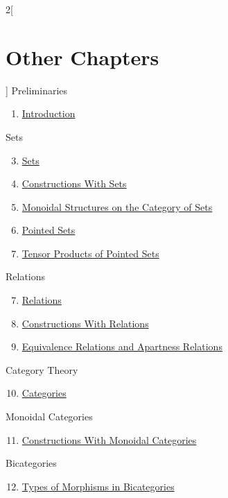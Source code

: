 \begin{multicols}{2}[\section{Other Chapters}]
\noindent
Preliminaries
\begin{enumerate}
\item \hyperref[introduction:section-phantom]{Introduction}
\end{enumerate}
Sets
\begin{enumerate}
\setcounter{enumi}{2}
\item \hyperref[sets:section-phantom]{Sets}
\item \hyperref[constructions-with-sets:section-phantom]{Constructions With Sets}
\item \hyperref[monoidal-structures-on-the-category-of-sets:section-phantom]{Monoidal Structures on the Category of Sets}
\item \hyperref[pointed-sets:section-phantom]{Pointed Sets}
\item \hyperref[tensor-products-of-pointed-sets:section-phantom]{Tensor Products of Pointed Sets}
\end{enumerate}
Relations
\begin{enumerate}
\setcounter{enumi}{6}
\item \hyperref[relations:section-phantom]{Relations}
\item \hyperref[constructions-with-relations:section-phantom]{Constructions With Relations}
\item \hyperref[equivalence-relations-and-apartness-relations:section-phantom]{Equivalence Relations and Apartness Relations}
\end{enumerate}
Category Theory
\begin{enumerate}
\setcounter{enumi}{9}
\item \hyperref[categories:section-phantom]{Categories}
\end{enumerate}
Monoidal Categories
\begin{enumerate}
\setcounter{enumi}{10}
\item \hyperref[constructions-with-monoidal-categories:section-phantom]{Constructions With Monoidal Categories}
\end{enumerate}
Bicategories
\begin{enumerate}
\setcounter{enumi}{11}
\item \hyperref[types-of-morphisms-in-bicategories:section-phantom]{Types of Morphisms in Bicategories}
\end{enumerate}
\end{multicols}
